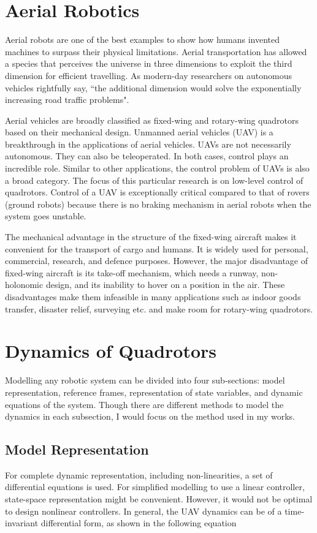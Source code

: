 \section{Aerial Robotics}
Aerial robots are one of the best examples to show how humans invented machines to surpass their physical limitations. Aerial transportation has allowed a species that perceives the universe in three dimensions to exploit the third dimension for efficient travelling. As modern-day researchers on autonomous vehicles rightfully say, ``the additional dimension would solve the exponentially increasing road traffic problems".

Aerial vehicles are broadly classified as fixed-wing and rotary-wing quadrotors based on their mechanical design. Unmanned aerial vehicles (UAV) is a breakthrough in the applications of aerial vehicles. UAVs are not necessarily autonomous. They can also be teleoperated. In both cases, control plays an incredible role. Similar to other applications, the control problem of UAVs is also a broad category. The focus of this particular research is on low-level control of quadrotors. Control of a UAV is exceptionally critical compared to that of rovers (ground robots) because there is no braking mechanism in aerial robots when the system goes unstable.

The mechanical advantage in the structure of the fixed-wing aircraft makes it convenient for the transport of cargo and humans. It is widely used for personal, commercial, research, and defence purposes. However, the major disadvantage of fixed-wing aircraft is its take-off mechanism, which needs a runway, non-holonomic design, and its inability to hover on a position in the air. These disadvantages make them infeasible in many applications such as indoor goods transfer, disaster relief, surveying etc. and make room for rotary-wing quadrotors.

\section{Dynamics of Quadrotors}
Modelling any robotic system can be divided into four sub-sections: model representation, reference frames, representation of state variables, and dynamic equations of the system. Though there are different methods to model the dynamics in each subsection, I would focus on the method used in my works.

\subsection{Model Representation}
For complete dynamic representation, including non-linearities, a set of differential equations is used. For simplified modelling to use a linear controller, state-space representation might be convenient. However, it would not be optimal to design nonlinear controllers. In general, the UAV dynamics can be of a time-invariant differential form, as shown in the following equation

